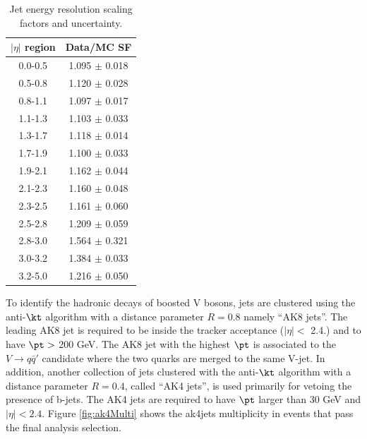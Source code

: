 \begin{table}[!ht]
\begin{small}
\begin{center}
\caption{Jet energy resolution scaling factors and uncertainty.}
\label{tab:JER}
\begin{tabular}{cc} \hline
$\left| \eta \right|$ region  & Data/MC SF  \\ \hline
0.0-0.5 &  1.095 $\pm$ 0.018  \\
0.5-0.8  &  1.120 $\pm$ 0.028\\
0.8-1.1  &  1.097 $\pm$ 0.017 \\
1.1-1.3  &  1.103 $\pm$ 0.033 \\
1.3-1.7  &  1.118 $\pm$ 0.014 \\
1.7-1.9  &   1.100 $\pm$  0.033\\
1.9-2.1 &  1.162 $\pm$ 0.044   \\
2.1-2.3  &  1.160 $\pm$ 0.048 \\
2.3-2.5  &  1.161 $\pm$ 0.060 \\ 
2.5-2.8  &  1.209 $\pm$ 0.059  \\
2.8-3.0  &  1.564 $\pm$ 0.321  \\
3.0-3.2  &  1.384 $\pm$ 0.033  \\
3.2-5.0  &  1.216 $\pm$ 0.050  \\
\end{tabular}
\end{center}
\end{small}
\end{table}

To identify the hadronic decays of boosted V bosons, jets are clustered using the anti-$\kt$ algorithm with a distance parameter $R=0.8$ namely ``AK8 jets''. The leading AK8 jet is required to be inside the tracker acceptance ($\left| \eta\right| <$ 2.4.) and to have $\pt >$ 200 GeV.
The AK8 jet with the highest $\pt$ is associated to the $V \rightarrow q \bar{q}'$ candidate where the two quarks are merged to the same V-jet.
In addition, another collection of jets clustered with the anti-$\kt$ algorithm with a distance parameter $R=0.4$, called ``AK4 jets'', is used primarily for vetoing the presence of b-jets. The AK4 jets are required to have $\pt$ larger than 30 GeV and $\left| \eta\right| <  2.4$. Figure \ref{fig:ak4Multi} shows the ak4jets multiplicity in events that pass the final analysis selection.

